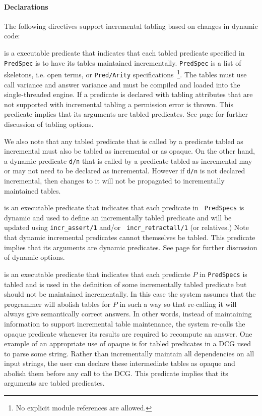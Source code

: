 \paragraph{Declarations} The following directives support incremental
tabling based on changes in dynamic code: 

\begin{description}

%
is a executable predicate that indicates that each tabled predicate
specified in {\tt PredSpec} is to have its tables maintained
incrementally.  {\tt PredSpec} is a list of skeletons, i.e. open
terms, or {\tt Pred/Arity} specifications~\footnote{No explicit module
  references are allowed.}.  The tables must use call variance and
answer variance and must be compiled and loaded into the
single-threaded engine.  If a predicate is declared with tabling
attributes that are not supported with incremental tabling a
permission error is thrown.  This predicate implies that its arguments
are tabled predicates.  See page \pageref{table-declaration} for
further discussion of tabling options.

We also note that any tabled predicate that is called by a predicate
tabled as incremental must also be tabled as incremental or as opaque.
On the other hand, a dynamic predicate {\tt d/n} that is called by a
predicate tabled as incremental may or may not need to be declared as
incremental.  However if {\tt d/n} is not declared incremental, then
changes to it will not be propagated to incrementally maintained
tables.

%
is an executable predicate that indicates that each predicate in {\tt
  PredSpecs} is dynamic and used to define an incrementally tabled
predicate and will be updated using {\tt incr\_assert/1} and/or {\tt
  incr\_retractall/1} (or relatives.)  Note that dynamic incremental
predicates cannot themselves be tabled.  This predicate implies that
its arguments are dynamic predicates.  See page
\pageref{dynamic-declaration} for further discussion of dynamic
options.

%
is an executable predicate that indicates that each predicate $P$ in
{\tt PredSpecs} is tabled and is used in the definition of some
incrementally tabled predicate but should not be maintained
incrementally.  In this case the system assumes that the programmer
will abolish tables for $P$ in such a way so that re-calling it will
always give semantically correct answers.  In other words, instead of
maintaining information to support incremental table maintenance, the
system re-calls the opaque predicate whenever its results are required
to recompute an answer.  One example of an appropriate use of opaque
is for tabled predicates in a DCG used to parse some string.  Rather
than incrementally maintain all dependencies on all input strings, the
user can declare these intermediate tables as opaque and abolish them
before any call to the DCG.  This predicate implies that its arguments
are tabled predicates.


\end{description}
